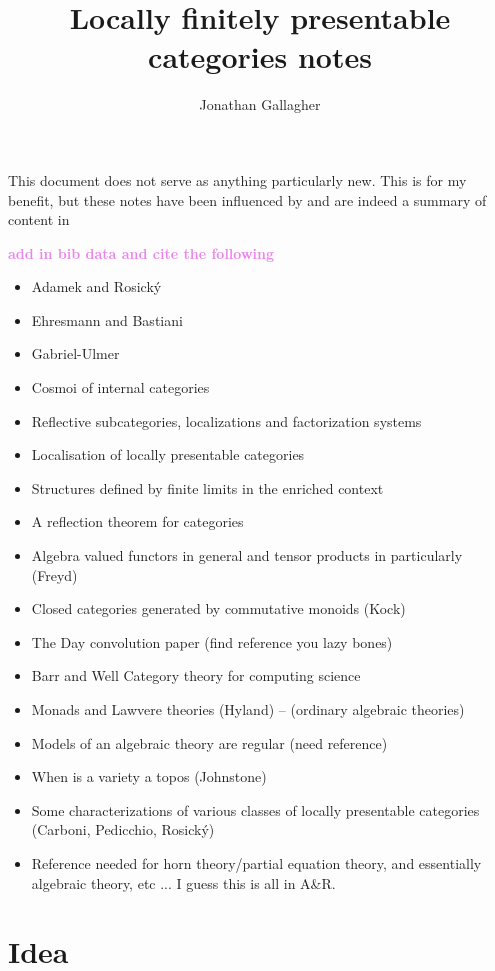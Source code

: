 \documentclass{article}
\title{Locally finitely presentable categories notes}
\author{Jonathan Gallagher}
\newcommand{\<}{\left\langle}
\renewcommand{\>}{\right\rangle}
\begin{document}
\maketitle

This document does not serve as anything particularly new.  This is for my benefit,
but these notes have been influenced by and are indeed a summary of content in 

\textcolor{violet}{\bf add in bib data and cite the following}
\begin{itemize}
    \item Adamek and Rosick\'{y} 
    \item Ehresmann and Bastiani
    \item Gabriel-Ulmer
    \item Cosmoi of internal categories
    \item Reflective subcategories, localizations and factorization systems
    \item Localisation of locally presentable categories
    \item Structures defined by finite limits in the enriched context
    \item A reflection theorem for categories
    \item Algebra valued functors in general and tensor products in particularly (Freyd)
    \item Closed categories generated by commutative monoids (Kock)
    \item The Day convolution paper (find reference you lazy bones)
    \item Barr and Well Category theory for computing science
    \item Monads and Lawvere theories (Hyland) -- (ordinary algebraic theories)
    \item Models of an algebraic theory are regular (need reference)
    \item When is a variety a topos (Johnstone)
    \item Some characterizations of various classes of locally presentable categories (Carboni, Pedicchio, Rosick\'{y})
    \item Reference needed for horn theory/partial equation theory, and essentially algebraic theory, etc ... I guess this is all in A\&R.
\end{itemize}

\section{Idea}
\end{document}
